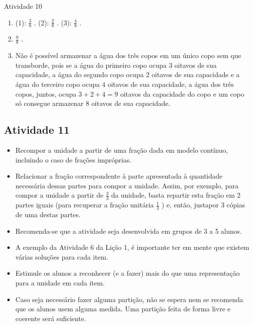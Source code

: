 \begin{multicols}{2}
\begin{resposta*}{Atividade 10}
\begin{enumerate} [\quad a)] %
    \item       (1):       $\frac{3}{8}$      . (2):       $\frac{2}{8}$      . (3):       $\frac{4}{8}$      .
    \item             $\frac{9}{8}$      .
    \item       Não é possível armazenar a água dos três copos em um único copo sem que transborde, pois se a água do primeiro copo ocupa       $3$       oitavos de sua capacidade, a água do segundo copo ocupa       $2$       oitavos de sua capacidade e a água do terceiro copo ocupa       $4$       oitavos de sua capacidade, a água dos três copos, juntos, ocupa       $3 + 2 + 4 = 9$       oitavos da capacidade do copo e um copo só consegue armazenar       $8$       oitavos de sua capacidade.
\end{enumerate} %

\end{resposta*}



\subsection{Atividade 11}

   \vspace{.1cm}

  \begin{itemize} %
    \item       Recompor a unidade a partir de uma fração dada em modelo contínuo, incluindo o caso de frações impróprias.
    \item       Relacionar a fração correspondente à parte apresentada à quantidade necessária dessas partes para compor a unidade. Assim, por exemplo, para compor a unidade a partir de       $\frac{2}{3}$       da unidade, basta repartir esta fração em 2 partes iguais (para recuperar a fração unitária       $\frac{1}{3}$      ) e, então, justapor 3 cópias de uma destas partes.
\end{itemize} %

  \vspace{.1cm} \vspace{.1cm}

  \begin{itemize} %
    \item       Recomenda-se que a atividade seja desenvolvida em grupos de 3 a 5 alunos.
    \item       A exemplo da Atividade 6 da Lição 1, é importante ter em mente que existem várias soluções para cada item.
    \item       Estimule os alunos a reconhecer (e a fazer) mais do que uma representação para a unidade em cada item.
    \item       Caso seja necessário fazer alguma partição, não se espera nem se recomenda que os alunos usem alguma medida. Uma partição feita de forma livre e coerente será suficiente.
\end{itemize} %


\end{multicols}
